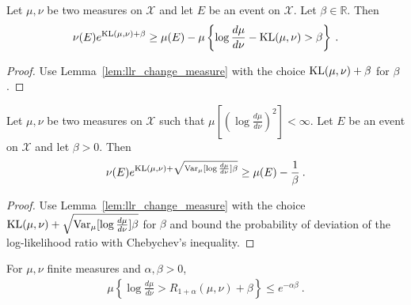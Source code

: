 \begin{corollary}
  \label{cor:kl_change_measure}
  Let $\mu, \nu$ be two measures on $\mathcal X$ and let $E$ be an event on $\mathcal X$. Let $\beta \in \mathbb{R}$. Then
  \begin{align*}
  \nu(E) e^{\operatorname{KL}(\mu, \nu) + \beta} \ge \mu(E) - \mu\left\{ \log\frac{d \mu}{d \nu} - \operatorname{KL}(\mu, \nu) > \beta \right\} \: .
  \end{align*}
\end{corollary}

\begin{proof}
Use Lemma~\ref{lem:llr_change_measure} with the choice $\operatorname{KL}(\mu, \nu) + \beta$ for $\beta$.
\end{proof}

\begin{lemma}
  \label{lem:llr_change_measure_variance}
  \uses{}
  Let $\mu, \nu$ be two measures on $\mathcal X$ such that $\mu\left[\left(\log\frac{d \mu}{d \nu}\right)^2\right] < \infty$. Let $E$ be an event on $\mathcal X$ and let $\beta > 0$. Then
  \begin{align*}
  \nu(E) e^{\operatorname{KL}(\mu, \nu) + \sqrt{\operatorname{Var}_\mu[\log\frac{d \mu}{d \nu}]\beta}} \ge \mu(E) - \frac{1}{\beta} \: .
  \end{align*}
\end{lemma}

\begin{proof}%
{}
Use Lemma~\ref{lem:llr_change_measure} with the choice $\operatorname{KL}(\mu, \nu) + \sqrt{\operatorname{Var}_\mu[\log\frac{d \mu}{d \nu}]\beta}$ for $\beta$ and bound the probability of deviation of the log-likelihood ratio with Chebychev's inequality.
\end{proof}

\begin{lemma}
  \label{lem:renyi_chernoff_bound}
  \leanok
  For $\mu, \nu$ finite measures and $\alpha, \beta > 0$,
  \begin{align*}
  \mu\left\{ \log\frac{d \mu}{d \nu} > R_{1+\alpha}(\mu, \nu) + \beta \right\}
  \le e^{- \alpha \beta}
  \: .
  \end{align*}
\end{lemma}

